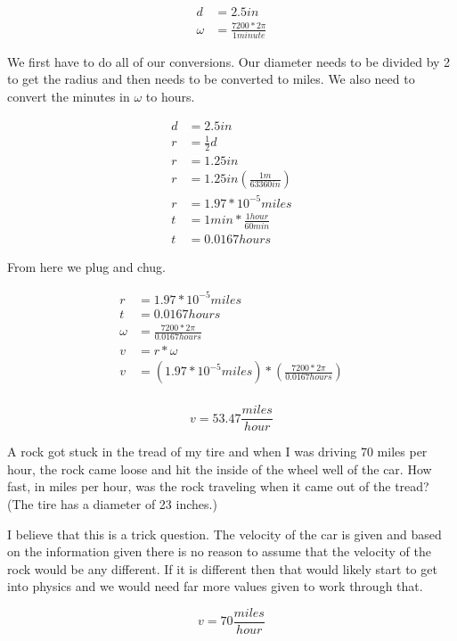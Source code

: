 \documentclass[10pt,letterpaper]{amspset}
\begin{document}
\begin{solution}
\begin{align}
    d &= 2.5in \\
    \omega &= \frac{7200 * 2\pi}{1minute}
\end{align}

We first have to do all of our conversions. Our diameter needs to be divided by 2 to get the radius and then needs to be converted to miles. We also need to convert the minutes in $\omega$ to hours. 

\begin{align}
    d &= 2.5in \\[+3mm]
    r &= \frac{1}{2}d \\[+3mm]
    r &= 1.25in \\[+3mm]
    r &= 1.25in \left(\frac{1m}{63360in}\right) \\[+3mm]
    r &= 1.97 * 10^{-5}miles \\[+3mm]
    t &= 1 min * \frac{1hour}{60min} \\[+3mm]
    t &= 0.0167hours
\end{align}

From here we plug and chug.

\begin{align}
    r &= 1.97 * 10^{-5}miles \\[+3mm]
    t &= 0.0167hours \\[+3mm] 
    \omega &= \frac{7200 * 2\pi}{0.0167hours} \\[+3mm]
    v &= r * \omega \\[+3mm]
    v &= (1.97 * 10^{-5}miles) * \left(\frac{7200 * 2\pi}{0.0167hours} \right) \\[+3mm]
\end{align}

\[\boxed{v = 53.47 \frac{miles}{hour}}\]
\end{solution}

\pagebreak


\begin{problem}[54.]
A rock got stuck in the tread of my tire and when I was driving 70 miles per hour, the rock
came loose and hit the inside of the wheel well of the car. How fast, in miles per hour, was
the rock traveling when it came out of the tread? (The tire has a diameter of 23 inches.)
\end{problem}

\begin{solution}[Solution]
I believe that this is a trick question. The velocity of the car is given and based on the information given there is no reason to assume that the velocity of the rock would be any different. If it is different then that would likely start to get into physics and we would need far more values given to work through that. 

\[\boxed{v = 70\frac{miles}{hour}}\]
\end{solution}
\end{document}
